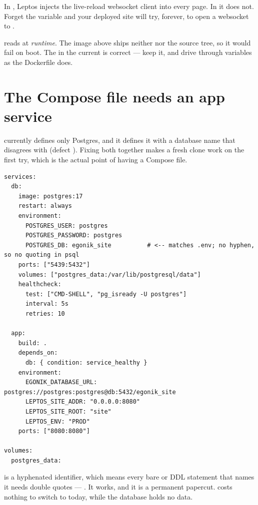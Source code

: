 \begin{pitfall}[\code{LEPTOS\_ENV="PROD"} is not cosmetic]
In , Leptos injects the live-reload websocket client into every page. In  it
does not. Forget the variable and your deployed site will try, forever, to open a websocket to
.
\end{pitfall}

\begin{pitfall}
 reads  at \emph{runtime}. The
image above ships neither  nor the source tree, so it would fail on boot. The
 in the current  is correct --- keep it, and drive 
through  variables as the Dockerfile does.
\end{pitfall}

\section{The Compose file needs an app service}

 currently defines only Postgres, and it defines it with a database name
that disagrees with  (defect ). Fixing both together makes a fresh clone work
on the first try, which is the actual point of having a Compose file.

\begin{lstlisting}[style=sh,caption={The corrected \file{docker-compose.yml}.}]
services:
  db:
    image: postgres:17
    restart: always
    environment:
      POSTGRES_USER: postgres
      POSTGRES_PASSWORD: postgres
      POSTGRES_DB: egonik_site          # <-- matches .env; no hyphen, so no quoting in psql
    ports: ["5439:5432"]
    volumes: ["postgres_data:/var/lib/postgresql/data"]
    healthcheck:
      test: ["CMD-SHELL", "pg_isready -U postgres"]
      interval: 5s
      retries: 10

  app:
    build: .
    depends_on:
      db: { condition: service_healthy }
    environment:
      EGONIK_DATABASE_URL: postgres://postgres:postgres@db:5432/egonik_site
      LEPTOS_SITE_ADDR: "0.0.0.0:8080"
      LEPTOS_SITE_ROOT: "site"
      LEPTOS_ENV: "PROD"
    ports: ["8080:8080"]

volumes:
  postgres_data:
\end{lstlisting}

\begin{pattern}
 is a hyphenated identifier, which means every bare  or DDL statement
that names it needs double quotes --- . It works, and it is a
permanent papercut.  costs nothing to switch to today, while the database holds
no data.
\end{pattern}

